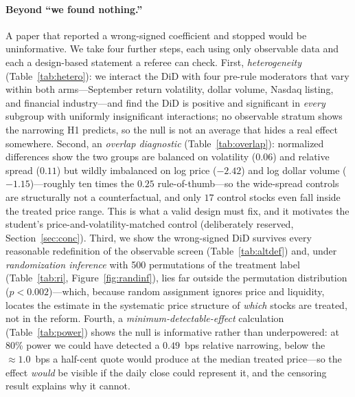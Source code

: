 \documentclass[12pt]{article}
\begin{document}
\paragraph{Beyond ``we found nothing.''} A paper that reported a wrong-signed coefficient and
stopped would be uninformative. We take four further steps, each using only observable data
and each a design-based statement a referee can check. First, \emph{heterogeneity}
(Table~\ref{tab:hetero}): we interact the DiD with four pre-rule moderators that vary within
both arms---September return volatility, dollar volume, Nasdaq listing, and financial
industry---and find the DiD is positive and significant in \emph{every} subgroup with
uniformly insignificant interactions; no observable stratum shows the narrowing H1 predicts,
so the null is not an average that hides a real effect somewhere. Second, an \emph{overlap
diagnostic} (Table~\ref{tab:overlap}): normalized differences show the two groups are balanced
on volatility ($0.06$) and relative spread ($0.11$) but wildly imbalanced on log price
($-2.42$) and log dollar volume ($-1.15$)---roughly ten times the $0.25$ rule-of-thumb---so the
wide-spread controls are structurally not a counterfactual, and only $17$ control stocks even
fall inside the treated price range. This is what a valid design must fix, and it motivates the
student's price-and-volatility-matched control (deliberately reserved, Section~\ref{sec:conc}).
Third, we show the wrong-signed DiD survives every reasonable redefinition of the observable
screen (Table~\ref{tab:altdef}) and, under \emph{randomization inference} with 500 permutations
of the treatment label (Table~\ref{tab:ri}, Figure~\ref{fig:randinf}), lies far outside the
permutation distribution ($p<0.002$)---which, because random assignment ignores price and
liquidity, locates the estimate in the systematic price structure of \emph{which} stocks are
treated, not in the reform. Fourth, a \emph{minimum-detectable-effect} calculation
(Table~\ref{tab:power}) shows the null is informative rather than underpowered: at 80\% power
we could have detected a $0.49$~bps relative narrowing, below the $\approx\!1.0$~bps a
half-cent quote would produce at the median treated price---so the effect \emph{would} be
visible if the daily close could represent it, and the censoring result explains why it cannot.
\end{document}
